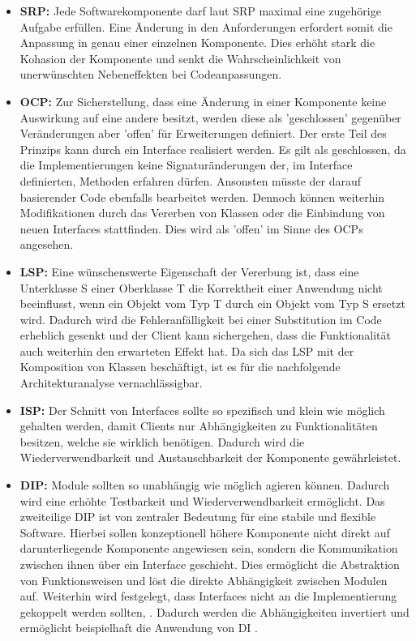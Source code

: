 \begin{itemize}[]
	\item \textbf{\acrlong{SRP}: } {Jede Softwarekomponente darf laut SRP maximal eine zugehörige Aufgabe erfüllen. Eine Änderung in den Anforderungen erfordert somit die Anpassung in genau einer einzelnen Komponente. Dies erhöht stark die \Gls{Kohasion} der Komponente und senkt die Wahrscheinlichkeit von unerwünschten Nebeneffekten bei Codeanpassungen. \cite{Martin.SRP, Martin.2018}}
	\item \textbf{\acrlong{OCP}: } {Zur Sicherstellung, dass eine Änderung in einer Komponente keine Auswirkung auf eine andere besitzt, werden diese als 'geschlossen' gegenüber Veränderungen aber 'offen' für Erweiterungen definiert. Der erste Teil des Prinzips kann durch ein Interface realisiert werden. Es gilt als geschlossen, da die Implementierungen keine Signaturänderungen der, im Interface definierten, Methoden erfahren dürfen. Ansonsten müsste der darauf basierender Code ebenfalls bearbeitet werden. Dennoch können weiterhin Modifikationen durch das Vererben von Klassen oder die Einbindung von neuen Interfaces stattfinden. Dies wird als 'offen' im Sinne des OCPs angesehen. \cite{Martin.2018, Meyer.2009}}
	\item \textbf{\acrlong{LSP}: } {Eine wünschenswerte Eigenschaft der Vererbung ist, dass eine Unterklasse S einer Oberklasse T die Korrektheit einer Anwendung nicht beeinflusst, wenn ein Objekt vom Typ T durch ein Objekt vom Typ S ersetzt wird. Dadurch wird die Fehleranfälligkeit bei einer Substitution im Code erheblich gesenkt und der Client kann sichergehen, dass die Funktionalität auch weiterhin den erwarteten Effekt hat. Da sich das LSP mit der Komposition von Klassen beschäftigt, ist es für die nachfolgende Architekturanalyse vernachlässigbar. \cite{Martin.2018, Liskov.1994}}
	\item \textbf{\acrlong{ISP}: } {Der Schnitt von Interfaces sollte so spezifisch und klein wie möglich gehalten werden, damit Clients nur Abhängigkeiten zu Funktionalitäten besitzen, welche sie wirklich benötigen. Dadurch wird die Wiederverwendbarkeit und Austauschbarkeit der Komponente gewährleistet. \cite{Martin.2018}\cite[S. 135ff.]{Martin.2003}}
	\item \textbf{\acrlong{DIP}: } {Module sollten so unabhängig wie möglich agieren können. Dadurch wird eine erhöhte Testbarkeit und Wiederverwendbarkeit ermöglicht. Das zweiteilige DIP ist von zentraler Bedeutung für eine stabile und flexible Software. Hierbei sollen konzeptionell höhere Komponente nicht direkt auf darunterliegende Komponente angewiesen sein, sondern die Kommunikation zwischen ihnen über ein Interface geschieht. Dies ermöglicht die Abstraktion von Funktionsweisen und löst die direkte Abhängigkeit zwischen Modulen auf. Weiterhin wird festgelegt, dass Interfaces nicht an die Implementierung gekoppelt werden sollten,  \cite{Martin.1996, Martin.2018}. Dadurch werden die Abhängigkeiten invertiert und ermöglicht beispielhaft die Anwendung von \Gls{DI} \cite{Fowler.2004}.}
\end{itemize}

